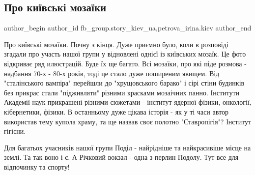  
 
 
 
 
 
\subsection{Про київські мозаїки}
\label{sec:30_04_2020.fb.fb_group.story_kiev_ua.2.kievskie_mozaiki}
 
\ifcmt
 author_begin
   author_id fb_group.story_kiev_ua,petrova_irina.kiev
 author_end
\fi

Про київські мозаїки. Почну з кінця. Дуже приємно було, коли в розповіді
згадали про участь нашої групи у відновлені однієї із київських мозаїк. Це фото
відкриває ряд илюстрацій. Буде їх ще багато. Всі мозаїки, про які піде розмова
- надбання 70-х - 80-х років, тоді це стало дуже поширеним явищем. Від
"сталінського  вампіра" перейшли до "хрущовського барако" і сірі стіни будинків
без прикрас стали "підживляти" різними красками мозаічних панно. Інститути
Академії наук  прикрашені різними сюжетами - інститут ядерної фізики,
онкології, кібернетики, фізики. В останньому дуже цікава історія - як у ті часи
автор використав тему купола храму, та ще назвав своє полотно "Ставропігія"?
Інститут гігієни.

\begin{multicols}{2}
\end{multicols}

Для багатьох учасників нашої групи Поділ - найрідніше та найкрасивіше місце на
землі. Та так воно і є. А Річковий вокзал - одна з перлин Подолу.  Тут все для
відпочинку та спорту!

